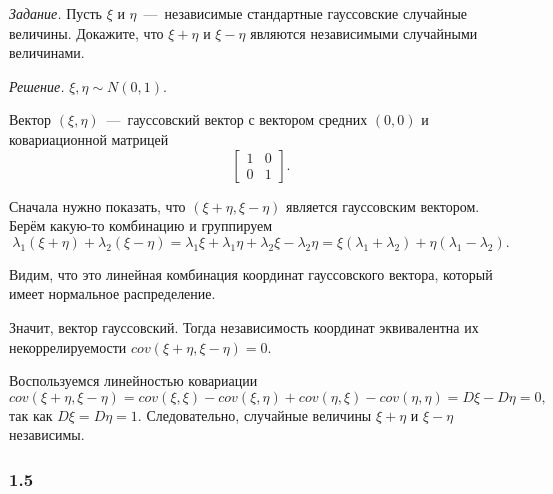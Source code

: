 \textit{Задание.}
Пусть $ \xi $ и
$ \eta $~---~независимые стандартные гауссовские случайные величины.
Докажите, что $ \xi + \eta $ и $ \xi - \eta $
являются независимыми случайными величинами.

\textit{Решение.}
$ \xi, \eta \sim N \left( 0, 1 \right) $.

Вектор $ \left( \xi, \eta \right) $~---~гауссовский вектор с вектором средних
$ \left( 0, 0 \right) $ и ковариационной матрицей
\begin{equation*}
  \begin{bmatrix}
    1 & 0 \\
    0 & 1
  \end{bmatrix}.
\end{equation*}

Сначала нужно показать,
что $ \left( \xi + \eta, \xi - \eta \right) $ является гауссовским вектором.
Берём какую-то комбинацию и группируем
\begin{equation*}
  \lambda_1 \left( \xi + \eta \right) + \lambda_2 \left( \xi - \eta \right) =
  \lambda_1 \xi + \lambda_1 \eta + \lambda_2 \xi - \lambda_2 \eta =
  \xi \left( \lambda_1 + \lambda_2 \right) +
  \eta \left( \lambda_1 - \lambda_2 \right).
\end{equation*}

Видим, что это линейная комбинация координат гауссовского вектора,
который имеет нормальное распределение.

Значит, вектор гауссовский.
Тогда независимость координат эквивалентна их некоррелируемости
$cov \left( \xi + \eta, \xi - \eta \right) =
 0$.

Воспользуемся линейностью ковариации
\begin{equation*}
  cov \left( \xi + \eta, \xi - \eta \right) =
  cov \left( \xi, \xi \right) - cov \left( \xi, \eta \right) +
  cov \left( \eta, \xi \right) - cov \left( \eta, \eta \right) =
  D \xi - D \eta =
  0,
\end{equation*}
так как $D \xi = D \eta = 1$.
Следовательно, случайные величины $ \xi + \eta $ и $ \xi - \eta $ независимы.

\subsubsection*{1.5}

